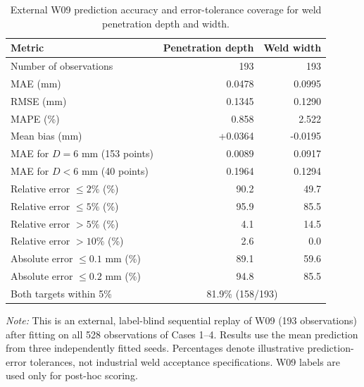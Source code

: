 \begin{table}[htbp]
    \centering
    \caption{External W09 prediction accuracy and error-tolerance coverage for weld penetration depth and width.}
    \label{tab:w09_online_metrics}
    \setlength{\tabcolsep}{5pt}
    \renewcommand{\arraystretch}{1.08}
    \begin{tabular}{lrr}
        \toprule
        Metric & Penetration depth & Weld width \\
        \midrule
        Number of observations & 193 & 193 \\
        MAE (mm) & 0.0478 & 0.0995 \\
        RMSE (mm) & 0.1345 & 0.1290 \\
        MAPE (\%) & 0.858 & 2.522 \\
        Mean bias (mm) & +0.0364 & -0.0195 \\
        MAE for $D=6$ mm (153 points) & 0.0089 & 0.0917 \\
        MAE for $D<6$ mm (40 points) & 0.1964 & 0.1294 \\
        Relative error $\leq 2\%$ (\%) & 90.2 & 49.7 \\
        Relative error $\leq 5\%$ (\%) & 95.9 & 85.5 \\
        Relative error $>5\%$ (\%) & 4.1 & 14.5 \\
        Relative error $>10\%$ (\%) & 2.6 & 0.0 \\
        Absolute error $\leq 0.1$ mm (\%) & 89.1 & 59.6 \\
        Absolute error $\leq 0.2$ mm (\%) & 94.8 & 85.5 \\
        \midrule
        Both targets within 5\% & \multicolumn{2}{c}{81.9\% (158/193)} \\
        \bottomrule
    \end{tabular}
    \par\vspace{3pt}
    \begin{minipage}{0.90\linewidth}\footnotesize
    \emph{Note:} This is an external, label-blind sequential replay of W09
    (193 observations) after fitting on all 528 observations of Cases 1--4.
    Results use the mean prediction from three independently fitted seeds.
    Percentages denote illustrative prediction-error tolerances, not industrial
    weld acceptance specifications. W09 labels are used only for post-hoc scoring.
    \end{minipage}
\end{table}

